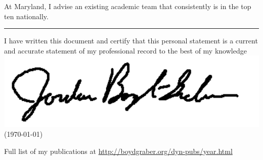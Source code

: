 \documentclass[11pt]{amsart}
\begin{document}
At Maryland, I advise an existing academic team that
consistently is in the top ten nationally.

\noindent\rule{4cm}{0.4pt}


    \parbox{\linewidth}{I have written this document and certify that this
  personal statement is a current and accurate statement of my
  professional record to the best of my
  knowledge \flushright  \includegraphics[width=.2\linewidth]{resume_src/signature} \\
  \flushright  (\today{})}

\clearpage

\begin{multicols}{2}
  \footnotesize


  
\begin{center}
Full list of my publications at \url{http://boydgraber.org/dyn-pubs/year.html}
\end{center}



\end{multicols}
\end{document}
